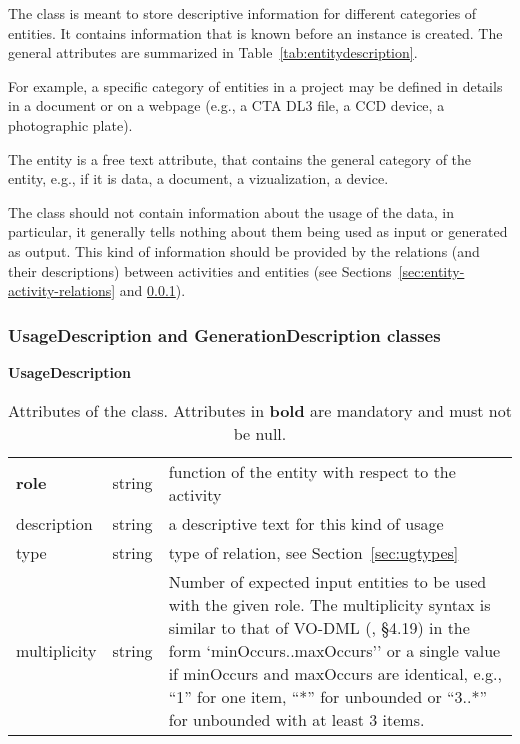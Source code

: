 The  class is meant to store descriptive information for different categories of entities. It contains information that is known before an  instance is created. The  general attributes are summarized in Table~\ref{tab:entitydescription}.

For example, a specific category of entities in a project may be defined in details in a document or on a webpage (e.g., a CTA DL3 file, a CCD device, a photographic plate).

The entity  is a free text attribute, that contains the general category of the entity, e.g., if it is data, a document, a vizualization, a device.

The  class should not contain information about the usage of the data, in particular, it generally tells nothing about them being used as input or generated as output. This kind of information should be provided by the relations (and their descriptions) between activities and entities (see Sections~\ref{sec:entity-activity-relations} and \ref{sec:use_gen_desc}).


\subsubsection{UsageDescription and GenerationDescription classes}
\label{sec:use_gen_desc}

\begin{table}[ht]
\small
{}\textwidth
\textbf{\normalsize UsageDescription}\vspace{0.25em}\\
\begin{tabulary}{1.0\textwidth}{llL}
\toprule
{} &   & \\
\midrule
\textbf{role} & string   & function of the entity with respect to the activity \\
description  & string & a descriptive text for this kind of usage \\
type    & string   & type of relation, see Section~\ref{sec:ugtypes} \\
multiplicity & string & Number of expected input entities to be used with the given role. The multiplicity syntax is similar to that of VO-DML (\citealt{2018ivoa.spec.0910L}, \S4.19) in the form `minOccurs..maxOccurs'' or a single value if minOccurs and maxOccurs are identical, e.g., ``1'' for one item, ``*'' for unbounded or ``3..*'' for unbounded with at least 3 items. \\
\bottomrule
\end{tabulary}
\caption[Attributes of the  class]{Attributes of the  class. Attributes in \textbf{bold} are mandatory and must not be null.}
\label{tab:usagedescription}
\end{table}


